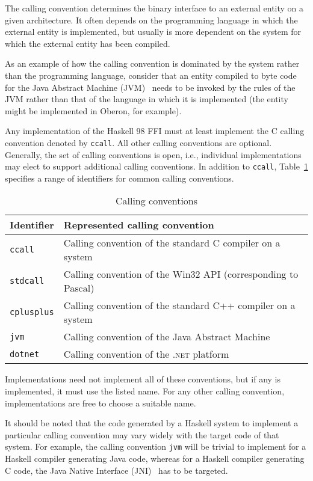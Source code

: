 \documentclass[a4paper,twosides]{article}
\newcommand{\code}[1]{\texttt{#1}}      %
\begin{document}
The calling convention determines the binary interface to an external entity
on a given architecture.  It often depends on the programming language in
which the external entity is implemented, but usually is more dependent on the
system for which the external entity has been compiled.

As an example of how the calling convention is dominated by the system rather
than the programming language, consider that an entity compiled to byte code
for the Java Abstract Machine (JVM)~\cite{lindholm-etal:JVM} needs to be
invoked by the rules of the JVM rather than that of the language in which it
is implemented (the entity might be implemented in Oberon, for example).

Any implementation of the Haskell 98 FFI must at least implement the C calling
convention denoted by \code{ccall}.  All other calling conventions are
optional.  Generally, the set of calling conventions is open, i.e., individual
implementations may elect to support additional calling conventions.  In
addition to \code{ccall}, Table~\ref{tab:callconv} specifies a range of
identifiers for common calling conventions.
%
\begin{table}[tbp]
  \begin{center}
    \begin{tabular}{|l|l|}
      \hline
      Identifier & Represented calling convention\\
      \hline\hline
      \code{ccall} 
      & Calling convention of the standard C compiler on a system\\
      \code{stdcall}
      & Calling convention of the Win32 API (corresponding to Pascal)\\
      \code{cplusplus}
      & Calling convention of the standard C{+}{+} compiler on a system\\
      \code{jvm} 
      & Calling convention of the Java Abstract Machine\\
      \code{dotnet}
      & Calling convention of the \textsc{.net} platform\\
      \hline
    \end{tabular}
    \caption{Calling conventions}
    \label{tab:callconv}
  \end{center}
\end{table}
%
Implementations need not implement all of these conventions, but if any is
implemented, it must use the listed name.  For any other calling convention,
implementations are free to choose a suitable name.

It should be noted that the code generated by a Haskell system to implement a
particular calling convention may vary widely with the target code of that
system.  For example, the calling convention \code{jvm} will be trivial to
implement for a Haskell compiler generating Java code, whereas for a Haskell
compiler generating C code, the Java Native Interface (JNI)~\cite{liang:JNI}
has to be targeted.
\end{document}
